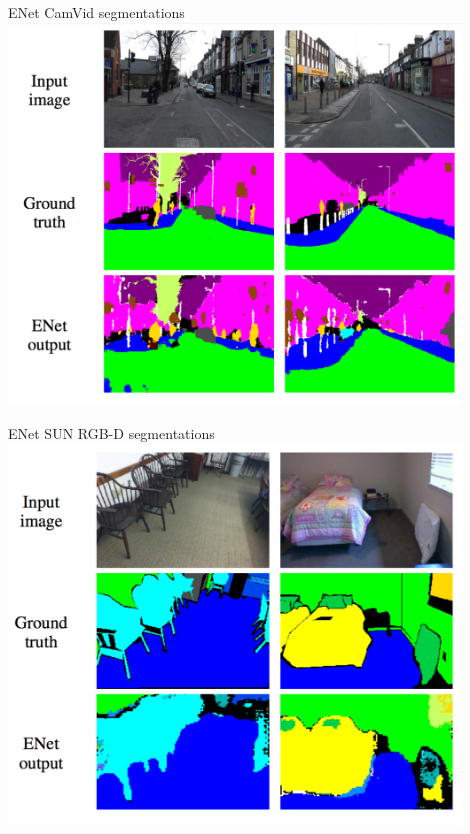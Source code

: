 \documentclass[]{beamer}
\begin{document}
\begin{frame}{ENet CamVid segmentations}
\centering
\includegraphics[width=0.9\textwidth]{figures/enet-camvid}
\end{frame}

\begin{frame}{ENet SUN RGB-D segmentations}
\centering
\includegraphics[width=0.9\textwidth]{figures/enet-sun-rgbd}
\end{frame}
\end{document}
